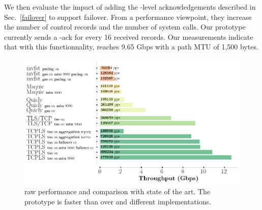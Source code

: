We then evaluate the impact of adding the \tcpls-level acknowledgements
described in Sec.~\ref{failover} to support failover.
From a performance viewpoint, they increase the number of control records and
the number of system calls. Our prototype currently sends a \tcpls-ack for every
16 received records. Our measurements indicate that with this functionnality,
\tcpls reaches 9.65 Gbps with a path MTU of 1,500 bytes.

\begin{figure}[!t]
  \begin{center}
    \includegraphics[width=\columnwidth]{figures/perf_analysis.png}
  \end{center}
\vspace{-0.5cm}
  \caption{\tcpls raw performance and comparison with state of the art.  The \tcpls prototype is faster than \tls over \tcp and different \quic implementations.}
  \label{fig:perf}
\end{figure}



